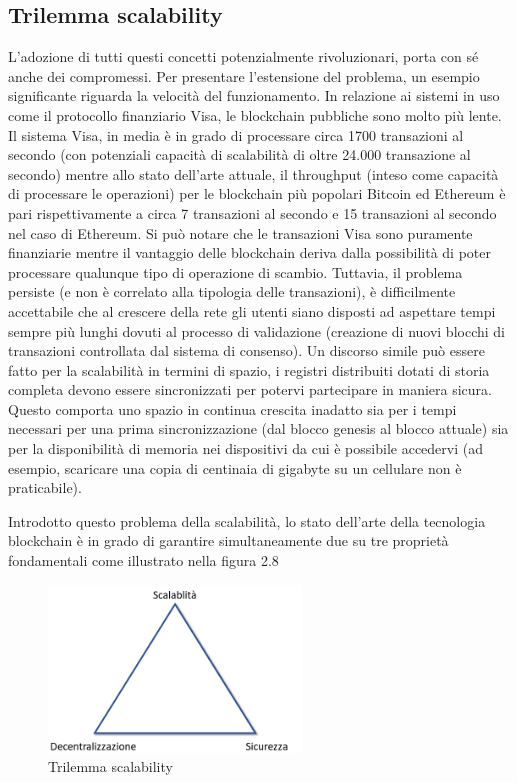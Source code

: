 \subsection{Trilemma scalability}

L'adozione di tutti questi concetti potenzialmente rivoluzionari, porta con sé anche dei compromessi. Per presentare l’estensione del problema, un esempio significante riguarda la velocità del funzionamento. In relazione ai sistemi in uso come il protocollo finanziario Visa, le blockchain pubbliche sono molto più lente. Il sistema Visa, in media è in grado di processare circa 1700 transazioni al secondo (con potenziali capacità di scalabilità di oltre 24.000 transazione al secondo) mentre allo stato dell’arte attuale, il throughput (inteso come capacità di processare le operazioni) per le blockchain più popolari Bitcoin ed Ethereum è pari rispettivamente a circa 7 transazioni al secondo e 15 transazioni al secondo nel caso di Ethereum. Si può notare che le transazioni Visa sono puramente finanziarie mentre il vantaggio delle blockchain deriva dalla possibilità di poter processare qualunque tipo di operazione di scambio. Tuttavia, il problema persiste (e non è correlato alla tipologia delle transazioni), è difficilmente accettabile che al crescere della rete gli utenti siano disposti ad aspettare tempi sempre più lunghi dovuti al processo di validazione (creazione di nuovi blocchi di transazioni controllata dal sistema di consenso). Un discorso simile può essere fatto per la scalabilità in termini di spazio, i registri distribuiti dotati di storia completa devono essere sincronizzati per potervi partecipare in maniera sicura. Questo comporta uno spazio in continua crescita inadatto sia per i tempi necessari per una prima sincronizzazione (dal blocco genesis al blocco attuale) sia per la disponibilità di memoria nei dispositivi da cui è possibile accedervi (ad esempio, scaricare una copia di centinaia di gigabyte su un cellulare non è praticabile). 

Introdotto questo problema della scalabilità, lo stato dell’arte della tecnologia blockchain è in grado di garantire simultaneamente due su tre proprietà fondamentali come illustrato nella figura 2.8

\begin{figure}[H]
\centering
\includegraphics[width=0.6\textwidth]{immagini/trilemmascalab.png}
\caption{Trilemma scalability}
\label{fig:meshtest7x}
\end{figure}

